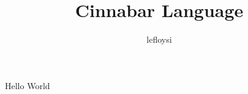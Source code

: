 \documentclass[article, oneside]{memoir}
\title{Cinnabar Language}
\author{lefloysi}
\date{}
\begin{document}

\newpage
Hello World
\end{document}
